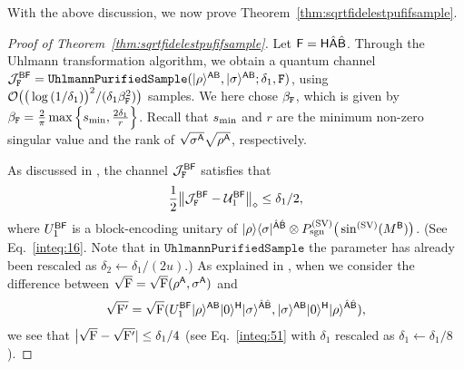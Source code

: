 With the above discussion, we now prove Theorem~\ref{thm:sqrtfidelestpufifsample}.



\begin{proof}[Proof of Theorem~\ref{thm:sqrtfidelestpufifsample}]



Let ${\mathsf{F}}={\mathsf{H}}\hat{{\mathsf{A}}}\hat{{\mathsf{B}}}$.
Through the Uhlmann transformation algorithm, we obtain a quantum channel ${\mathcal{J}}_{\mathtt{F}}^{{\mathsf{B}}{\mathsf{F}}} = \mathtt{UhlmannPurifiedSample}(|\rho\rangle^{{\mathsf{A}}{\mathsf{B}}}, |\sigma\rangle^{{\mathsf{A}}{\mathsf{B}}}; \delta_1, \mathtt{F})$, using ${\mathcal{O}}\big(\big(\log{(1/\delta_1)}\big)^2/(\delta_1\beta_{\mathtt{F}}^2)\big)$ samples.
We here chose $\beta_{\mathtt{F}}$, which is given by $\beta_{\mathtt{F}} = \frac{2}{\pi}\max\Big\{s_{\rm min}, \frac{2\delta_1}{r}\Big\}$. Recall that $s_{\rm min}$ and $r$ are the minimum non-zero singular value and the rank of $\sqrt{\sigma^{\mathsf{A}}}\sqrt{\rho^{\mathsf{A}}}$, respectively.


As discussed in , the channel ${\mathcal{J}}_{\mathtt{F}}^{{\mathsf{B}}{\mathsf{F}}}$ satisfies that
\begin{align}
\label{inteq:69}
    \frac{1}{2}\big\|{\mathcal{J}}_{\mathtt{F}}^{{\mathsf{B}}{\mathsf{F}}} - {\mathcal{U}}_1^{{\mathsf{B}}{\mathsf{F}}}\big\|_\diamond \leq \delta_1/2,
\end{align}
where $U_1^{{\mathsf{B}}{\mathsf{F}}}$ is a block-encoding unitary of $|\rho\rangle\langle\sigma|^{\hat{{\mathsf{A}}}\hat{{\mathsf{B}}}}\otimes P_{\mathrm{sgn}}^{(\rm SV)}\big(\sin^{(\rm SV)}(M^{\mathsf{B}})\big)$.
(See Eq.~\eqref{inteq:16}. Note that in $\mathtt{UhlmannPurifiedSample}$ the parameter has already been rescaled as $\delta_2 \gets \delta_1 / (2u)$.)  
As explained in , when we consider the difference between $\sqrt{{\mathrm{F}}}=\sqrt{{\mathrm{F}}}(\rho^{\mathsf{A}}, \sigma^{\mathsf{A}})$ and 
\begin{align}
    \sqrt{{\mathrm{F}}'} = \sqrt{{\mathrm{F}}}(U_1^{{\mathsf{B}}{\mathsf{F}}}|\rho\rangle^{{\mathsf{A}}{\mathsf{B}}}|0\rangle^{\mathsf{H}}|\sigma\rangle^{\hat{{\mathsf{A}}}\hat{{\mathsf{B}}}}, |\sigma\rangle^{{\mathsf{A}}{\mathsf{B}}}|0\rangle^{\mathsf{H}}|\rho\rangle^{\hat{{\mathsf{A}}}\hat{{\mathsf{B}}}}),
\end{align}
we see that $\big|\sqrt{{\mathrm{F}}} - \sqrt{{\mathrm{F}}'}| \leq \delta_1/4$ (see Eq.~\eqref{inteq:51} with $\delta_1$ rescaled as $\delta_1 \gets \delta_1/8$). 



\end{proof}
